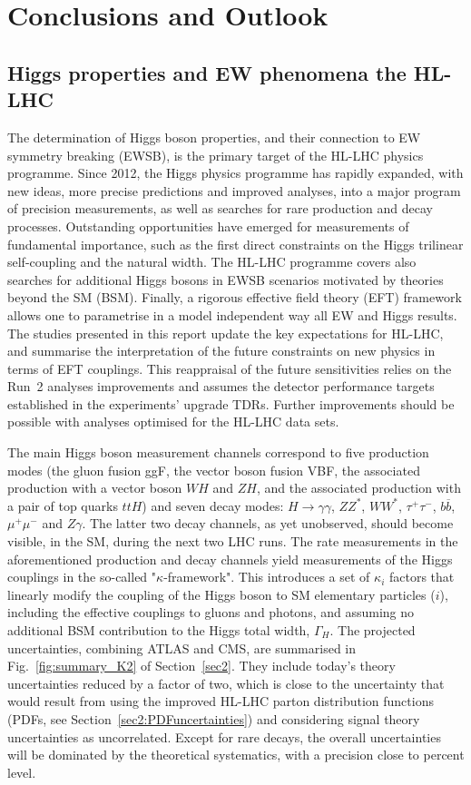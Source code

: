 \documentclass[../report.tex]{subfiles}
\begin{document}
\section{Conclusions and Outlook}
\subsection{Higgs properties and EW phenomena the HL-LHC}
The determination of Higgs boson properties, and their connection to EW symmetry breaking (EWSB), is the primary target of the HL-LHC physics programme. Since 2012, the Higgs physics programme has rapidly expanded, with new ideas, more precise predictions and improved analyses, into a major program of precision measurements, as well as  searches for rare production and decay processes. Outstanding opportunities have emerged for measurements of fundamental importance, such as the first direct constraints on the Higgs trilinear self-coupling and the natural width. The HL-LHC programme covers also searches for additional Higgs bosons in EWSB scenarios motivated by theories beyond the SM (BSM). Finally, a rigorous effective field theory (EFT) framework allows one to parametrise in a model independent way all EW and Higgs results. 
The studies presented in this report update the key expectations for HL-LHC,  and summarise the interpretation of the future constraints on new physics in terms of EFT couplings. This reappraisal of the future sensitivities relies on the Run~2 analyses improvements and assumes the detector performance targets established in the experiments' upgrade TDRs.
Further improvements should be possible with analyses optimised for the HL-LHC data sets.

The main Higgs boson measurement channels correspond to five production modes (the gluon fusion ggF, the vector boson fusion VBF, the associated production with a vector boson $WH$ and $ZH$, and the associated production with a pair of top quarks $ttH$) and seven decay modes: $H \to \gamma\gamma$, $ZZ^*$, $WW^*$, $\tau^+\tau^-$, $b\overline{b}$, $\mu^+\mu^-$ and $Z\gamma$. The latter two decay channels, as yet unobserved, should become visible, in the SM, during the next two LHC runs. 
The rate measurements in the aforementioned production and decay channels yield measurements of the Higgs couplings in the so-called "$\kappa$-framework". This introduces a set of $\kappa_i$ factors that linearly modify the coupling of the Higgs boson to SM elementary particles  ($i$), including the effective couplings to gluons and photons, and assuming no additional BSM contribution to the Higgs total width, $\Gamma_H$. The projected uncertainties, combining ATLAS and CMS, are summarised in Fig.~\ref{fig:summary_K2} of Section~\ref{sec2}. They include today's theory uncertainties reduced by a factor of two, which is close to the uncertainty that would result from using the improved HL-LHC parton distribution functions (PDFs, see Section~\ref{sec2:PDFuncertainties}) and considering signal theory uncertainties as uncorrelated. Except for rare decays, the overall uncertainties will be dominated by the theoretical systematics, with a precision close to percent level.
\end{document}
